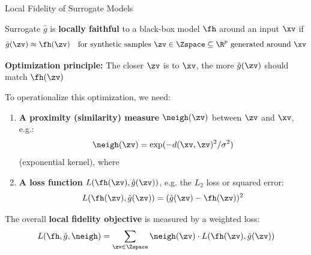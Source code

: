 \documentclass[10pt,compress,t,notes=noshow, xcolor=table]{beamer}
\newcommand{\gh}{\hat{g}}
\begin{document}
\begin{framev}[align=top]{Local Fidelity of Surrogate Models}
\begin{itemizeM}
\item Surrogate $\gh$ is \textbf{locally faithful} to a black-box model $\fh$ around an input $\xv$ if\\
$$\gh(\zv) \approx \fh(\zv) \quad \text{for synthetic samples } \zv \in \Zspace \subseteq \R^p \text{ generated around } \xv$$
\pause
\item \textbf{Optimization principle:}
The closer $\zv$ is to $\xv$, the more $\gh(\zv)$ should match $\fh(\zv)$
\pause
\item To operationalize this optimization, we need:
\begin{enumerate}
\item \textbf{A proximity (similarity) measure} $\neigh(\zv)$ between $\zv$ and $\xv$, e.g.:
$$
\neigh(\zv) = \exp(-d(\xv, \zv)^2 / \sigma^2)
$$
(exponential kernel), where
\pause
\item \textbf{A loss function} $L(\fh(\zv), \gh(\zv))$, e.g. the $L_2$ loss or squared error:
$$
L(\fh(\zv), \gh(\zv)) = (\gh(\zv) - \fh(\zv))^2
$$
\end{enumerate}
\pause
\item The overall \textbf{local fidelity objective} is measured by a weighted loss:
$$
L(\fh, \gh, \neigh) = \sum_{\zv \in \Zspace} \neigh(\zv) \cdot L(\fh(\zv), \gh(\zv))
$$
\end{itemizeM}
\end{framev}
\end{document}
